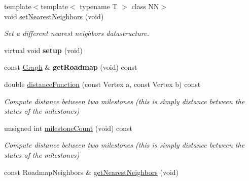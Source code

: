 \begin{DoxyCompactItemize}
\item 
\hypertarget{class_f_i_r_m_a8dd7c5ed3fa065f5f37d79bc1d220474}{{\footnotesize template$<$template$<$ typename T $>$ class \-N\-N$>$ }\\void \hyperlink{class_f_i_r_m_a8dd7c5ed3fa065f5f37d79bc1d220474}{set\-Nearest\-Neighbors} (void)}\label{class_f_i_r_m_a8dd7c5ed3fa065f5f37d79bc1d220474}

\begin{DoxyCompactList}\small\item\em \-Set a different nearest neighbors datastructure. \end{DoxyCompactList}\item 
\hypertarget{class_f_i_r_m_a78c43a180deb28296e4cab5c6939c600}{virtual void {\bfseries setup} (void)}\label{class_f_i_r_m_a78c43a180deb28296e4cab5c6939c600}

\item 
\hypertarget{class_f_i_r_m_aacad0b0dfc1413f78c6dc76fdbac9ce7}{const \hyperlink{class_f_i_r_m_a687e9f4243b22c30ee1fa5da22a85053}{\-Graph} \& {\bfseries get\-Roadmap} (void) const }\label{class_f_i_r_m_aacad0b0dfc1413f78c6dc76fdbac9ce7}

\item 
\hypertarget{class_f_i_r_m_a9a98fdb0da781d77fe6ff9a55e8a7a34}{double \hyperlink{class_f_i_r_m_a9a98fdb0da781d77fe6ff9a55e8a7a34}{distance\-Function} (const \-Vertex a, const \-Vertex b) const }\label{class_f_i_r_m_a9a98fdb0da781d77fe6ff9a55e8a7a34}

\begin{DoxyCompactList}\small\item\em \-Compute distance between two milestones (this is simply distance between the states of the milestones) \end{DoxyCompactList}\item 
\hypertarget{class_f_i_r_m_a558fbb0135ab096d3cd06e65b88533de}{unsigned int \hyperlink{class_f_i_r_m_a558fbb0135ab096d3cd06e65b88533de}{milestone\-Count} (void) const }\label{class_f_i_r_m_a558fbb0135ab096d3cd06e65b88533de}

\begin{DoxyCompactList}\small\item\em \-Compute distance between two milestones (this is simply distance between the states of the milestones) \end{DoxyCompactList}\item 
\hypertarget{class_f_i_r_m_ad6df82888d88ab8479f92f9f3e453c2e}{const \-Roadmap\-Neighbors \& \hyperlink{class_f_i_r_m_ad6df82888d88ab8479f92f9f3e453c2e}{get\-Nearest\-Neighbors} (void)}\label{class_f_i_r_m_ad6df82888d88ab8479f92f9f3e453c2e}


\end{DoxyCompactItemize}
